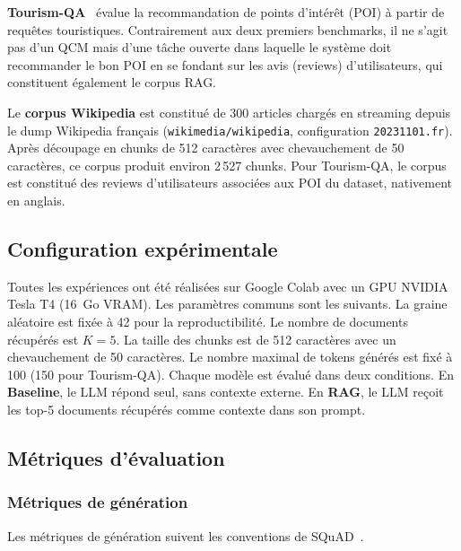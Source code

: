 \documentclass[12pt,a4paper]{article}
\begin{document}
\textbf{Tourism-QA}~\cite{tourismqa2021} \'evalue la recommandation de points d'int\'er\^et (POI) \`a partir de requ\^etes touristiques. Contrairement aux deux premiers benchmarks, il ne s'agit pas d'un QCM mais d'une t\^ache ouverte dans laquelle le syst\`eme doit recommander le bon POI en se fondant sur les avis (reviews) d'utilisateurs, qui constituent \'egalement le corpus RAG.

Le \textbf{corpus Wikipedia} est constitu\'e de 300 articles charg\'es en streaming depuis le dump Wikipedia fran\c{c}ais (\texttt{wikimedia/wikipedia}, configuration \texttt{20231101.fr}). Apr\`es d\'ecoupage en chunks de 512 caract\`eres avec chevauchement de 50 caract\`eres, ce corpus produit environ 2\,527 chunks. Pour Tourism-QA, le corpus est constitu\'e des reviews d'utilisateurs associ\'ees aux POI du dataset, nativement en anglais.

\subsection{Configuration exp\'erimentale}

Toutes les exp\'eriences ont \'et\'e r\'ealis\'ees sur Google Colab avec un GPU NVIDIA Tesla T4 (16~Go VRAM). Les param\`etres communs sont les suivants. La graine al\'eatoire est fix\'ee \`a 42 pour la reproductibilit\'e. Le nombre de documents r\'ecup\'er\'es est $K = 5$. La taille des chunks est de 512 caract\`eres avec un chevauchement de 50 caract\`eres. Le nombre maximal de tokens g\'en\'er\'es est fix\'e \`a 100 (150 pour Tourism-QA). Chaque mod\`ele est \'evalu\'e dans deux conditions. En \textbf{Baseline}, le LLM r\'epond seul, sans contexte externe. En \textbf{RAG}, le LLM re\c{c}oit les top-5 documents r\'ecup\'er\'es comme contexte dans son prompt.

\subsection{M\'etriques d'\'evaluation}

\subsubsection{M\'etriques de g\'en\'eration}

Les m\'etriques de g\'en\'eration suivent les conventions de SQuAD~\cite{rajpurkar2016squad}.
\end{document}
